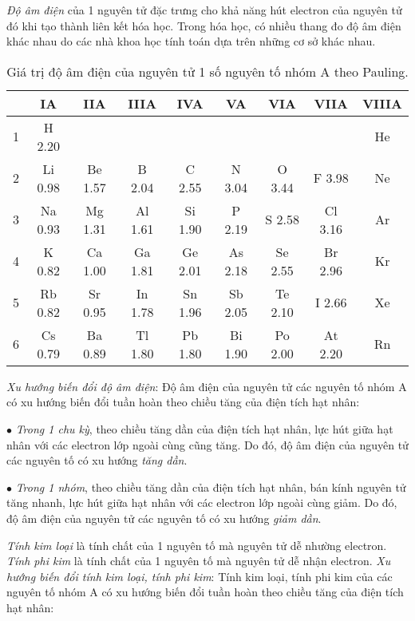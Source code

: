 \documentclass{article}
\numberwithin{equation}{section}
\begin{document}
\textit{Độ âm điện} của 1 nguyên tử đặc trưng cho khả năng hút electron của nguyên tử đó khi tạo thành liên kết hóa học. Trong hóa học, có nhiều thang đo độ âm điện khác nhau do các nhà khoa học tính toán dựa trên những cơ sở khác nhau. \begin{table}[h]
	\centering
	\begin{tabular}{|c|c|c|c|c|c|c|c|c|}
		\hline
		\diagbox{\textbf{Chu kỳ}}{\textbf{Nhóm}}& IA & IIA & IIIA & IVA & VA & VIA & VIIA & VIIIA \\
		\hline
		1 & H 2.20 &  &  &  &  &  &  & He \\
		\hline
		2 & Li 0.98 & Be 1.57 & B 2.04 & C 2.55 & N 3.04 & O 3.44 & F 3.98 & Ne \\
		\hline
		3 & Na 0.93 & Mg 1.31 & Al 1.61 & Si 1.90 & P 2.19 & S 2.58 & Cl 3.16 & Ar \\
		\hline
		4 & K 0.82 & Ca 1.00 & Ga 1.81 & Ge 2.01 & As 2.18 & Se 2.55 & Br 2.96 & Kr \\
		\hline
		5 & Rb 0.82 & Sr 0.95 & In 1.78 & Sn 1.96 & Sb 2.05 & Te 2.10 & I 2.66 & Xe \\
		\hline
		6 & Cs 0.79 & Ba 0.89 & Tl 1.80 & Pb 1.80 & Bi 1.90 & Po 2.00 & At 2.20 & Rn \\
		\hline
	\end{tabular}
	\caption{Giá trị độ âm điện của nguyên tử 1 số nguyên tố nhóm A theo Pauling.}
\end{table}
\textit{Xu hướng biến đổi độ âm điện}: Độ âm điện của nguyên tử các nguyên tố nhóm A có xu hướng biến đổi tuần hoàn theo chiều tăng của điện tích hạt nhân:
\begin{enumerate*}
	\item[$\bullet$] \textit{Trong 1 chu kỳ}, theo chiều tăng dần của điện tích hạt nhân, lực hút giữa hạt nhân với các electron lớp ngoài cùng cũng tăng. Do đó, độ âm điện của nguyên tử các nguyên tố có xu hướng \textit{tăng dần}.
	\item[$\bullet$] \textit{Trong 1 nhóm}, theo chiều tăng dần của điện tích hạt nhân, bán kính nguyên tử tăng nhanh, lực hút giữa hạt nhân với các electron lớp ngoài cùng giảm. Do đó, độ âm điện của nguyên tử các nguyên tố có xu hướng \textit{giảm dần}.
\end{enumerate*}
\emph{Tính kim loại} là tính chất của 1 nguyên tố mà nguyên tử dễ nhường electron. \emph{Tính phi kim} là tính chất của 1 nguyên tố mà nguyên tử dễ nhận electron. \textit{Xu hướng biến đổi tính kim loại, tính phi kim}: Tính kim loại, tính phi kim của các nguyên tố nhóm A có xu hướng biến đổi tuần hoàn theo chiều tăng của điện tích hạt nhân:
\end{document}
